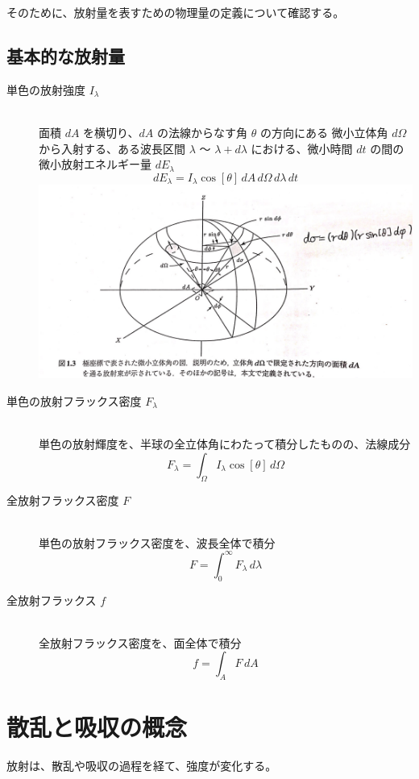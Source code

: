 \documentclass[article]{dennou777}
\begin{document}
そのために、放射量を表すための物理量の定義について確認する。

\subsection{基本的な放射量}
\begin{description}
	\item[単色の放射強度 $I_\lambda$]\leavevmode\\
		面積 $dA$ を横切り、$dA$ の法線からなす角 $\theta$ の方向にある
		微小立体角 $d\Omega$ から入射する、ある波長区間 $\lambda$ 〜
		$\lambda+d\lambda$ における、微小時間 $dt$ の間の微小放射エネルギー量
		$dE_\lambda$
		\[dE_\lambda=I_\lambda\cos[\theta]\,dA\,d\Omega\,d\lambda\,dt\]
		\includegraphics[width=\linewidth]{eq.jpg}
\end{description}

\begin{description}
	\item[単色の放射フラックス密度 $F_\lambda$]\leavevmode\\
		単色の放射輝度を、半球の全立体角にわたって積分したものの、法線成分
		\[F_\lambda=\int_\Omega I_\lambda\cos[\theta]\,d\Omega\]
	\item[全放射フラックス密度 $F$]\leavevmode\\
		単色の放射フラックス密度を、波長全体で積分
		\[F=\int^\infty_0 F_\lambda\,d\lambda\]
	\item[全放射フラックス $f$]\leavevmode\\
		全放射フラックス密度を、面全体で積分
		\[f=\int_AF\,dA\]
\end{description}

\section{散乱と吸収の概念}
放射は、散乱や吸収の過程を経て、強度が変化する。
\end{document}

